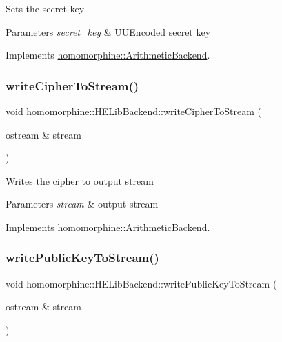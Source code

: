 Sets the secret key


\begin{DoxyParams}{Parameters}
{\em secret\+\_\+key} & U\+U\+Encoded secret key \\
\hline
\end{DoxyParams}


Implements \mbox{\hyperlink{classhomomorphine_1_1_arithmetic_backend_a0bb3c2728df4662c6472d4d43215410f}{homomorphine\+::\+Arithmetic\+Backend}}.

\mbox{\label{classhomomorphine_1_1_h_e_lib_backend_a3ec7bec3476ac21921f518ba7a3ff6b2}} 
\subsubsection{\texorpdfstring{writeCipherToStream()}{writeCipherToStream()}}
{\footnotesize\ttfamily void homomorphine\+::\+H\+E\+Lib\+Backend\+::write\+Cipher\+To\+Stream (\begin{DoxyParamCaption}\item[{ostream \&}]{stream }\end{DoxyParamCaption})\hspace{0.3cm}{\ttfamily [virtual]}}

Writes the cipher to output stream


\begin{DoxyParams}{Parameters}
{\em stream} & output stream \\
\hline
\end{DoxyParams}


Implements \mbox{\hyperlink{classhomomorphine_1_1_arithmetic_backend_a659d4f63a1020d942d561b7fa5e9eddf}{homomorphine\+::\+Arithmetic\+Backend}}.

\mbox{\label{classhomomorphine_1_1_h_e_lib_backend_acd7a366e43b8408d370424f136fc9f21}} 
\subsubsection{\texorpdfstring{writePublicKeyToStream()}{writePublicKeyToStream()}}
{\footnotesize\ttfamily void homomorphine\+::\+H\+E\+Lib\+Backend\+::write\+Public\+Key\+To\+Stream (\begin{DoxyParamCaption}\item[{ostream \&}]{stream }\end{DoxyParamCaption})\hspace{0.3cm}{\ttfamily [virtual]}}

